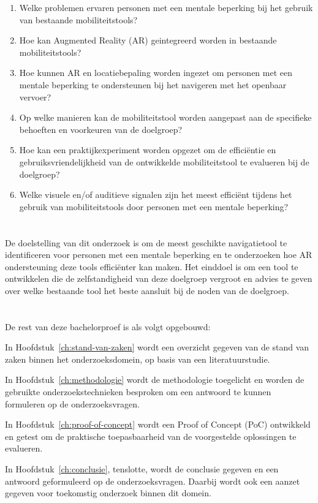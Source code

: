 \begin{enumerate}
    \item Welke problemen ervaren personen met een mentale beperking bij het gebruik van bestaande mobiliteitstools?
    \item Hoe kan Augmented Reality (AR) geintegreerd worden in bestaande mobiliteitstools?
    \item Hoe kunnen AR en locatiebepaling worden ingezet om personen met een mentale beperking te ondersteunen bij het navigeren met het openbaar vervoer?
    \item Op welke manieren kan de mobiliteitstool worden aangepast aan de specifieke behoeften en voorkeuren van de doelgroep?
    \item Hoe kan een praktijkexperiment worden opgezet om de efficiëntie en gebruiksvriendelijkheid van de ontwikkelde mobiliteitstool te evalueren bij de doelgroep?
    \item Welke visuele en/of auditieve signalen zijn het meest efficiënt tijdens het gebruik van mobiliteitstools door personen met een mentale beperking?
\end{enumerate}

\section{}%
\label{sec:onderzoeksdoelstelling}

De doelstelling van dit onderzoek is om de meest geschikte navigatietool te identificeren voor personen met een mentale beperking en te onderzoeken hoe AR ondersteuning deze tools efficiënter kan maken. Het einddoel is om een tool te ontwikkelen die de zelfstandigheid van deze doelgroep vergroot en advies te geven over welke bestaande tool het beste aansluit bij de noden van de doelgroep.

\section{}%
\label{sec:opzet-bachelorproef}

De rest van deze bachelorproef is als volgt opgebouwd:

In Hoofdstuk~\ref{ch:stand-van-zaken} wordt een overzicht gegeven van de stand van zaken binnen het onderzoeksdomein, op basis van een literatuurstudie.

In Hoofdstuk~\ref{ch:methodologie} wordt de methodologie toegelicht en worden de gebruikte onderzoekstechnieken besproken om een antwoord te kunnen formuleren op de onderzoeksvragen.

In Hoofdstuk~\ref{ch:proof-of-concept} wordt een Proof of Concept (PoC) ontwikkeld en getest om de praktische toepasbaarheid van de voorgestelde oplossingen te evalueren.

In Hoofdstuk~\ref{ch:conclusie}, tenslotte, wordt de conclusie gegeven en een antwoord geformuleerd op de onderzoeksvragen. Daarbij wordt ook een aanzet gegeven voor toekomstig onderzoek binnen dit domein.
